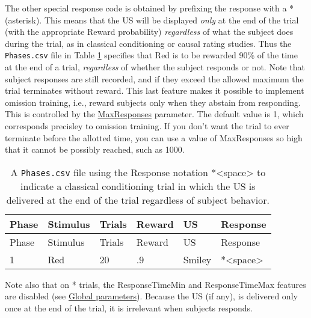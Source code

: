 \documentclass[11pt,]{article}
\begin{document}
The other special response code is obtained by prefixing the response
with a * (asterisk). This means that the US will be displayed
\emph{only} at the end of the trial (with the appropriate Reward
probability) \emph{regardless} of what the subject does during the
trial, as in classical conditioning or causal rating studies. Thus the
\texttt{Phases.csv} file in Table \ref{classical} specifies that Red is
to be rewarded 90\% of the time at the end of a trial, \emph{regardless}
of whether the subject responds or not. Note that subject responses are
still recorded, and if they exceed the allowed maximum the trial
terminates without reward. This last feature makes it possible to
implement omission training, i.e., reward subjects only when they
abstain from responding. This is controlled by the
\hyperref[maxresponses]{MaxResponses} parameter. The default value is 1,
which corresponds precisley to omission training. If you don't want the
trial to ever terminate before the allotted time, you can use a value of
MaxResponses so high that it cannot be possibly reached, such as 1000.

\begin{longtable}[c]{@{}llllll@{}}
\caption{A \texttt{Phases.csv} file using the Response notation
*\textless{}space\textgreater{} to indicate a classical conditioning
trial in which the US is delivered at the end of the trial regardless of
subject behavior. \label{classical}}\tabularnewline
\toprule
Phase & Stimulus & Trials & Reward & US & Response\tabularnewline
\midrule
\endfirsthead
\toprule
Phase & Stimulus & Trials & Reward & US & Response\tabularnewline
\midrule
\endhead
1 & Red & 20 & .9 & Smiley &
*\textless{}space\textgreater{}\tabularnewline
\bottomrule
\end{longtable}

Note also that on * trials, the ResponseTimeMin and ResponseTimeMax
features are disabled (see \hyperref[global]{Global parameters}).
Because the US (if any), is delivered only once at the end of the trial,
it is irrelevant when subjects responds.

\end{document}
